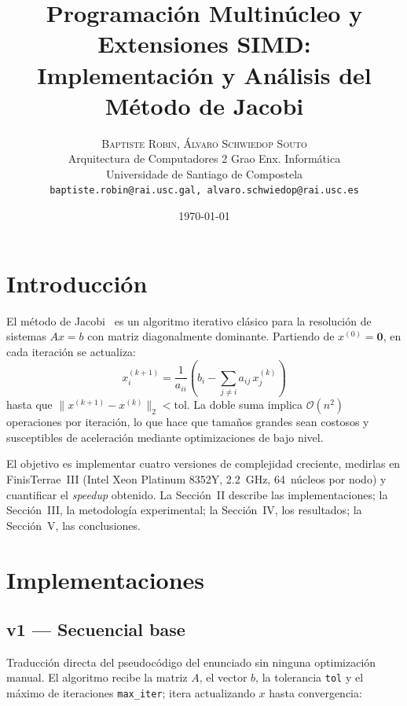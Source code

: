 \documentclass[a4paper,twocolumn]{article}
\title{Programación Multinúcleo y Extensiones SIMD:\\[4pt]
       Implementación y Análisis del Método de Jacobi}
\author{%
  \textsc{Baptiste Robin, Álvaro Schwiedop Souto}\\[0.5ex]
  \normalsize Arquitectura de Computadores \textbullet{} 2\textordmasculine{} Grao Enx. Informática\\
  \normalsize Universidade de Santiago de Compostela\\
  \normalsize \texttt{baptiste.robin@rai.usc.gal, alvaro.schwiedop@rai.usc.es}
}
\date{\today}
\begin{document}
\maketitle

\section{Introducción}

El método de Jacobi~\cite{saad2003} es un algoritmo iterativo clásico para la
resolución de sistemas $Ax{=}b$ con matriz diagonalmente dominante.  Partiendo de
$x^{(0)}{=}\mathbf{0}$, en cada iteración se actualiza:
\[
  x_i^{(k+1)} = \frac{1}{a_{ii}}\!\left(b_i - \sum_{j \neq i} a_{ij}\,x_j^{(k)}\right)
\]
hasta que $\|x^{(k+1)}-x^{(k)}\|_2 < \text{tol}$.  La doble suma implica
$\mathcal{O}(n^2)$ operaciones por iteración, lo que hace que tamaños grandes
sean costosos y susceptibles de aceleración mediante optimizaciones de bajo nivel.

El objetivo es implementar cuatro versiones de complejidad creciente, medirlas en
FinisTerrae~III (Intel Xeon Platinum 8352Y, 2.2~GHz, 64~núcleos por nodo) y
cuantificar el \textit{speedup} obtenido.  La Sección~II describe las
implementaciones; la Sección~III, la metodología experimental; la Sección~IV,
los resultados; la Sección~V, las conclusiones.

\section{Implementaciones}

\subsection{v1 --- Secuencial base}

Traducción directa del pseudocódigo del enunciado sin ninguna
optimización manual. El algoritmo recibe la matriz $A$, el vector
$b$, la tolerancia \texttt{tol} y el máximo de iteraciones
\texttt{max\_iter}; itera actualizando $x$ hasta convergencia:
\end{document}
